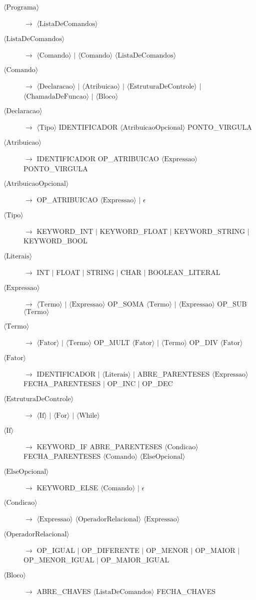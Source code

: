 \documentclass[12pt,a4paper]{article}
\newcommand{\nt}[1]{\ensuremath{\langle\text{#1}\rangle}}
\begin{document}
\begin{description}
    \item[\nt{Programa}] $\rightarrow$ \nt{ListaDeComandos}
    \item[\nt{ListaDeComandos}] $\rightarrow$ \nt{Comando} $\mid$ \nt{Comando} \nt{ListaDeComandos}
    \item[\nt{Comando}] $\rightarrow$ \nt{Declaracao} $\mid$ \nt{Atribuicao} $\mid$ \nt{EstruturaDeControle} $\mid$ \nt{ChamadaDeFuncao} $\mid$ \nt{Bloco}
    \item[\nt{Declaracao}] $\rightarrow$ \nt{Tipo} IDENTIFICADOR \nt{AtribuicaoOpcional} PONTO\_VIRGULA
    \item[\nt{Atribuicao}] $\rightarrow$ IDENTIFICADOR OP\_ATRIBUICAO \nt{Expressao} PONTO\_VIRGULA
    \item[\nt{AtribuicaoOpcional}] $\rightarrow$ OP\_ATRIBUICAO \nt{Expressao} $\mid$ $\epsilon$
    \item[\nt{Tipo}] $\rightarrow$ KEYWORD\_INT $\mid$ KEYWORD\_FLOAT $\mid$ KEYWORD\_STRING $\mid$ KEYWORD\_BOOL
    \item[\nt{Literais}] $\rightarrow$ INT $\mid$ FLOAT $\mid$ STRING $\mid$ CHAR $\mid$ BOOLEAN\_LITERAL
    \item[\nt{Expressao}] $\rightarrow$ \nt{Termo} $\mid$ \nt{Expressao} OP\_SOMA \nt{Termo} $\mid$ \nt{Expressao} OP\_SUB \nt{Termo}
    \item[\nt{Termo}] $\rightarrow$ \nt{Fator} $\mid$ \nt{Termo} OP\_MULT \nt{Fator} $\mid$ \nt{Termo} OP\_DIV \nt{Fator}
    \item[\nt{Fator}] $\rightarrow$ IDENTIFICADOR $\mid$ \nt{Literais} $\mid$ ABRE\_PARENTESES \nt{Expressao} FECHA\_PARENTESES $\mid$ OP\_INC $\mid$ OP\_DEC
    \item[\nt{EstruturaDeControle}] $\rightarrow$ \nt{If} $\mid$ \nt{For} $\mid$ \nt{While}
    \item[\nt{If}] $\rightarrow$ KEYWORD\_IF ABRE\_PARENTESES \nt{Condicao} FECHA\_PARENTESES \nt{Comando} \nt{ElseOpcional}
    \item[\nt{ElseOpcional}] $\rightarrow$ KEYWORD\_ELSE \nt{Comando} $\mid$ $\epsilon$
    \item[\nt{Condicao}] $\rightarrow$ \nt{Expressao} \nt{OperadorRelacional} \nt{Expressao}
    \item[\nt{OperadorRelacional}] $\rightarrow$ OP\_IGUAL $\mid$ OP\_DIFERENTE $\mid$ OP\_MENOR $\mid$ OP\_MAIOR $\mid$ OP\_MENOR\_IGUAL $\mid$ OP\_MAIOR\_IGUAL
    \item[\nt{Bloco}] $\rightarrow$ ABRE\_CHAVES \nt{ListaDeComandos} FECHA\_CHAVES


\end{description}
\end{document}
